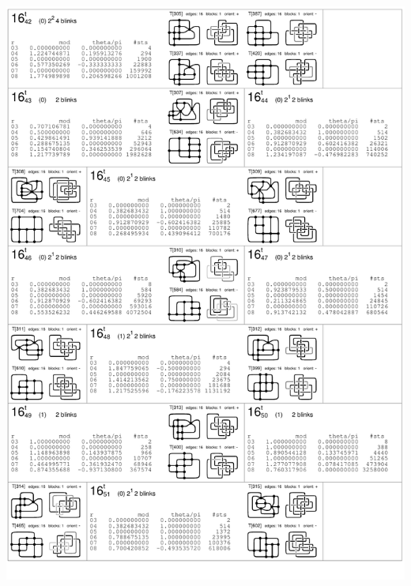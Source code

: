 \begin{center}
 \includegraphics[height=23.5cm]{E.figsbw2/con3catalog019_bw.pdf} \eject

\end{center}
